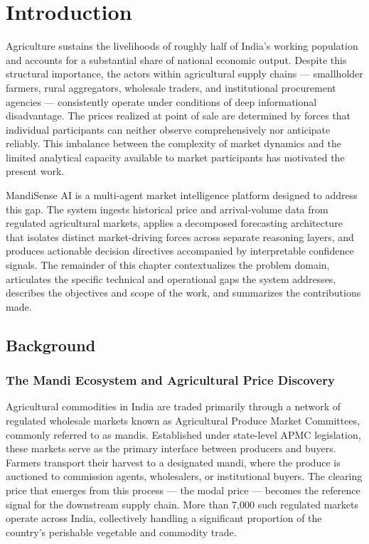 \documentclass[12pt,a4paper]{report}
\begin{document}
\chapter{Introduction}

Agriculture sustains the livelihoods of roughly half of India's working population and accounts for a substantial share of national economic output. Despite this structural importance, the actors within agricultural supply chains — smallholder farmers, rural aggregators, wholesale traders, and institutional procurement agencies — consistently operate under conditions of deep informational disadvantage. The prices realized at point of sale are determined by forces that individual participants can neither observe comprehensively nor anticipate reliably. This imbalance between the complexity of market dynamics and the limited analytical capacity available to market participants has motivated the present work.

MandiSense AI is a multi-agent market intelligence platform designed to address this gap. The system ingests historical price and arrival-volume data from regulated agricultural markets, applies a decomposed forecasting architecture that isolates distinct market-driving forces across separate reasoning layers, and produces actionable decision directives accompanied by interpretable confidence signals. The remainder of this chapter contextualizes the problem domain, articulates the specific technical and operational gaps the system addresses, describes the objectives and scope of the work, and summarizes the contributions made.

\section{Background}

\subsection{The Mandi Ecosystem and Agricultural Price Discovery}

Agricultural commodities in India are traded primarily through a network of regulated wholesale markets known as Agricultural Produce Market Committees, commonly referred to as mandis. Established under state-level APMC legislation, these markets serve as the primary interface between producers and buyers. Farmers transport their harvest to a designated mandi, where the produce is auctioned to commission agents, wholesalers, or institutional buyers. The clearing price that emerges from this process — the modal price — becomes the reference signal for the downstream supply chain. More than 7,000 such regulated markets operate across India, collectively handling a significant proportion of the country's perishable vegetable and commodity trade.
\end{document}
